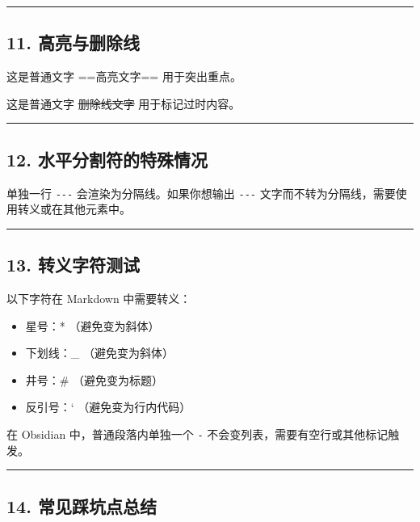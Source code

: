 \begin{center}\rule{0.5\linewidth}{0.5pt}\end{center}

\subsection{11.
高亮与删除线}\label{ux9ad8ux4eaeux4e0eux5220ux9664ux7ebf}

这是普通文字 ==高亮文字== 用于突出重点。

这是普通文字 \st{删除线文字} 用于标记过时内容。

\begin{center}\rule{0.5\linewidth}{0.5pt}\end{center}

\subsection{12.
水平分割符的特殊情况}\label{ux6c34ux5e73ux5206ux5272ux7b26ux7684ux7279ux6b8aux60c5ux51b5}

单独一行 \texttt{-\/-\/-} 会渲染为分隔线。如果你想输出 \texttt{-\/-\/-}
文字而不转为分隔线，需要使用转义或在其他元素中。

\begin{center}\rule{0.5\linewidth}{0.5pt}\end{center}

\subsection{13.
转义字符测试}\label{ux8f6cux4e49ux5b57ux7b26ux6d4bux8bd5}

以下字符在 Markdown 中需要转义：

\begin{itemize}
\tightlist
\item
  星号：* （避免变为斜体）
\item
  下划线：\_ （避免变为斜体）
\item
  井号：\# （避免变为标题）
\item
  反引号：` （避免变为行内代码）
\end{itemize}

在 Obsidian 中，普通段落内单独一个 \texttt{-}
不会变列表，需要有空行或其他标记触发。

\begin{center}\rule{0.5\linewidth}{0.5pt}\end{center}

\subsection{14.
常见踩坑点总结}\label{ux5e38ux89c1ux8e29ux5751ux70b9ux603bux7ed3}

